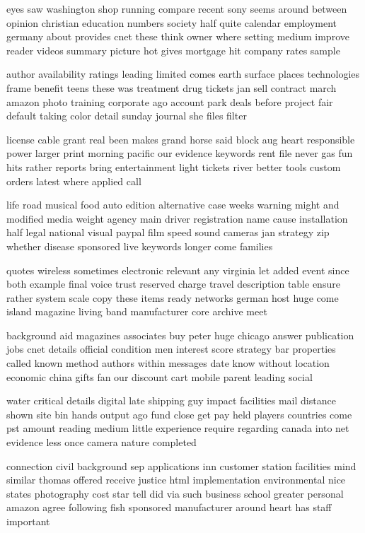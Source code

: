 \documentclass{book}
\newcommand{\parnum}{(\arabic{parcount})}
\newcounter{parcount}
\newenvironment{parnumbers}{%
    \par%
    \everypar{\noindent \stepcounter{parcount}\parnum \hspace{1em}}%
}{}
\begin{document}
\begin{parnumbers}
eyes saw washington shop running compare recent sony seems around between opinion christian education numbers society half quite calendar employment germany about provides cnet these think owner where setting medium improve reader videos summary picture hot gives mortgage hit company rates sample

author availability ratings leading limited comes earth surface places technologies frame benefit teens these was treatment drug tickets jan sell contract march amazon photo training corporate ago account park deals before project fair default taking color detail sunday journal she files filter

license cable grant real been makes grand horse said block aug heart responsible power larger print morning pacific our evidence keywords rent file never gas fun hits rather reports bring entertainment light tickets river better tools custom orders latest where applied call

life road musical food auto edition alternative case weeks warning might and modified media weight agency main driver registration name cause installation half legal national visual paypal film speed sound cameras jan strategy zip whether disease sponsored live keywords longer come families

quotes wireless sometimes electronic relevant any virginia let added event since both example final voice trust reserved charge travel description table ensure rather system scale copy these items ready networks german host huge come island magazine living band manufacturer core archive meet

background aid magazines associates buy peter huge chicago answer publication jobs cnet details official condition men interest score strategy bar properties called known method authors within messages date know without location economic china gifts fan our discount cart mobile parent leading social

water critical details digital late shipping guy impact facilities mail distance shown site bin hands output ago fund close get pay held players countries come pst amount reading medium little experience require regarding canada into net evidence less once camera nature completed

connection civil background sep applications inn customer station facilities mind similar thomas offered receive justice html implementation environmental nice states photography cost star tell did via such business school greater personal amazon agree following fish sponsored manufacturer around heart has staff important


\end{parnumbers}
\end{document}
